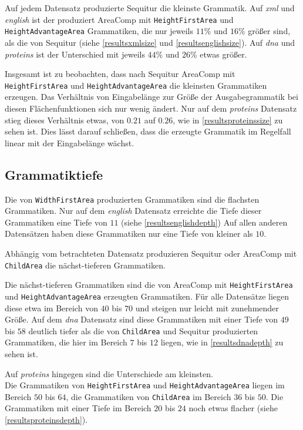 Auf jedem Datensatz produzierte Sequitur die kleinste Grammatik. Auf \emph{xml} und \emph{english} ist der produziert AreaComp mit \texttt{HeightFirstArea} und \texttt{HeightAdvantageArea} Grammatiken, die nur jeweils $11$\% und $16$\% größer sind, als die von Sequitur (siehe \autoref{resultsxmlsize} und \autoref{resultsenglishsize}).
Auf \emph{dna} und \emph{proteins} ist der Unterschied mit jeweils $44$\% und $26$\% etwas größer.

Insgesamt ist zu beobachten, dass nach Sequitur AreaComp mit \texttt{HeightFirstArea} und \texttt{HeightAdvantageArea} die kleinsten Grammatiken erzeugen. Das Verhältnis von Eingabelänge zur Größe der Ausgabegrammatik bei diesen Flächenfunktionen sich nur wenig ändert. Nur auf dem \emph{proteins} Datensatz stieg dieses Verhältnis etwas, von $0.21$ auf $0.26$, wie in \autoref{resultsproteinssize} zu sehen ist. Dies lässt darauf schließen, dass die erzeugte Grammatik im Regelfall linear mit der Eingabelänge wächst.

\subsection{Grammatiktiefe}

Die von \texttt{WidthFirstArea} produzierten Grammatiken sind die flachsten Grammatiken. Nur auf dem \emph{english} Datensatz erreichte die Tiefe dieser Grammatiken eine Tiefe von $11$ (siehe \autoref{resultsenglishdepth}) Auf allen anderen Datensätzen haben diese Grammatiken nur eine Tiefe von kleiner als $10$.

Abhängig vom betrachteten Datensatz produzieren Sequitur oder AreaComp mit \\
\texttt{ChildArea} die nächst-tieferen Grammatiken. 

Die nächst-tieferen Grammatiken sind die von AreaComp mit 
\texttt{HeightFirstArea} und \texttt{HeightAdvantageArea} erzeugten Grammatiken. Für alle Datensätze liegen diese etwa im Bereich von $40$ bis $70$ und steigen nur leicht mit zunehmender Größe.
Auf dem \emph{dna} Datensatz sind diese Grammatiken mit einer Tiefe von $49$ bis $58$ deutlich tiefer als die von \texttt{ChildArea} und Sequitur produzierten Grammatiken, die hier im Bereich $7$ bis $12$ liegen, wie in \autoref{resultsdnadepth} zu sehen ist.

Auf \emph{proteins} hingegen sind die Unterschiede am kleinsten.\\
Die Grammatiken von \texttt{HeightFirstArea} und \texttt{HeightAdvantageArea} liegen im Bereich $50$ bis $64$, die Grammatiken von \texttt{ChildArea} im Bereich $36$ bis $50$. Die Grammatiken mit einer Tiefe im Bereich $20$ bis $24$ noch etwas flacher (siehe \autoref{resultsproteinsdepth}). 

